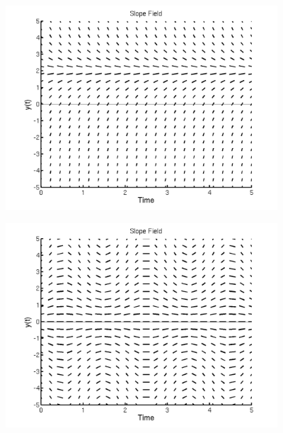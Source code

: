 \begin{problem}
  \begin{subproblem}
    \item \includegraphics[height=3.0in]{img/sfSteadyWk1}
    \item \includegraphics[height=3.0in]{img/sfOscillateWk1}

      \clearpage


\end{subproblem}
\end{problem}
